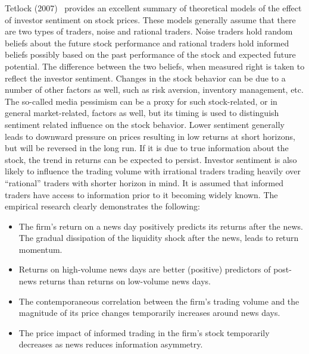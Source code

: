  
 Tetlock (2007)~\cite{tetlock2007giving} provides an excellent summary of theoretical models of the effect of investor sentiment on stock prices. These models generally assume that there are two types of traders, noise and rational traders. Noise traders hold random beliefs about the future stock performance and rational traders hold informed beliefs possibly based on the past performance of the stock and expected future potential. The difference between the two beliefs, when measured right is taken to reflect the investor sentiment. Changes in the stock behavior can be due to a number of other factors as well, such as risk aversion, inventory management, etc. The so-called media pessimism can be a proxy for such stock-related, or in general market-related, factors as well, but its timing is used to distinguish sentiment related influence on the stock behavior. Lower sentiment generally leads to downward pressure on prices resulting in low returns at short horizons, but will be reversed in the long run. If it is due to true information about the stock, the trend in returns can be expected to persist. Investor sentiment is also likely to influence the trading volume with irrational traders trading heavily over ``rational'' traders with shorter horizon in mind. It is assumed that informed traders have access to information prior to it becoming widely known. The empirical research clearly demonstrates the following:
 	\begin{itemize}
	\item The firm's return on a news day positively predicts its returns after the news. The gradual dissipation of the liquidity shock after the news, leads to return momentum.
	\item Returns on high-volume news days are better (positive) predictors of post-news returns than returns on low-volume news days.
	\item The contemporaneous correlation between the firm's trading volume and the magnitude of its price changes temporarily increases around news days.
	\item The price impact of informed trading in the firm's stock temporarily decreases as news reduces information asymmetry. 
	\end{itemize}
 
